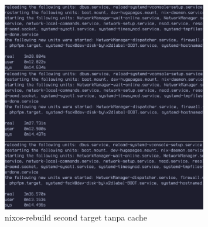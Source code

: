 \documentclass[10pt,twoside]{report}
\begin{document}
\begin{adjustwidth}{20pt}{}
\begin{adjustwidth}{20pt}{}
\begin{figure}[H]
\begin{center}
				\includegraphics[width=0.8\textwidth]{images/nix-target/nix-pasca-install-26-com.png}
			\end{center}
			\caption{nixos-rebuild second target tanpa cache}
		\end{figure}


\end{adjustwidth}
\end{adjustwidth}
\end{document}
